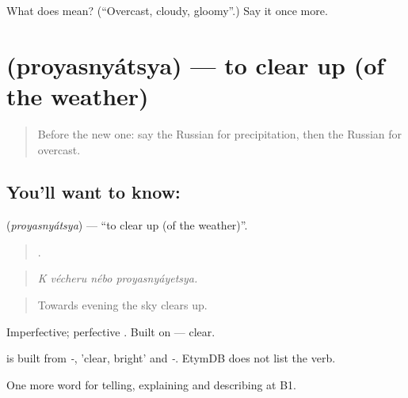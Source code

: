 \begin{tcolorbox}[breakable,colback=teal!4,colframe=teal!35!black,title={Before you move on}]
What does  mean? (\textquotedblleft{}Overcast, cloudy, gloomy\textquotedblright{}.) Say it once more.
\end{tcolorbox}
\section[\texorpdfstring{\ru{проясняться} (proyasnyátsya)}{проясняться (proyasnyátsya)}]{ (proyasnyátsya) — to clear up (of the weather)}

\label{lesson:RU-C464-proyasnyatsya}



\begin{quote}
Before the new one: say the Russian for precipitation, then the Russian for overcast.
\end{quote}

\subsection*{You'll want to know: }
\textbf{} (\emph{proyasnyátsya}) — \textquotedblleft{}to clear up (of the weather)\textquotedblright{}.

\begin{quote}
   .
\end{quote}

\begin{quote}
\emph{K vécheru nébo proyasnyáyetsya.}
\end{quote}

\begin{quote}
Towards evening the sky clears up.
\end{quote}

Imperfective; perfective \emph{}. Built on \emph{} — clear.

\begin{cousinweb}
\emph{} is built from \emph{-}, \emph{} 'clear, bright' and \emph{-}. EtymDB does not list the verb.
\end{cousinweb}

\begin{grammarlens}[title={What you've built}]
One more word for telling, explaining and describing at B1.
\end{grammarlens}

